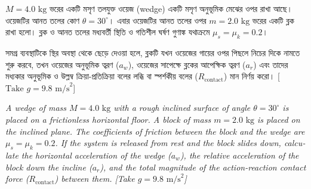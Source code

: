 \documentclass[12pt, a4paper]{article}
\begin{document}
\begin{tcolorbox}[questionbox={প্রশ্ন (Question)17}]
\noindent
$M = 4.0\text{ kg}$ ভরের একটি মসৃণ তলযুক্ত ওয়েজ (wedge) একটি মসৃণ অনুভূমিক মেঝের ওপর রাখা আছে। ওয়েজটির আনত তলের কোণ $\theta = 30^\circ$। এবার ওয়েজটির আনত তলের ওপর $m = 2.0\text{ kg}$ ভরের একটি ব্লক রাখা হলো। ব্লক ও আনত তলের মধ্যবর্তী স্থিতি ও গতিশীল ঘর্ষণ গুণাঙ্ক যথাক্রমে $\mu_s = \mu_k = 0.2$। 

\vspace{0.3em}
\noindent
সমগ্র ব্যবস্থাটিকে স্থির অবস্থা থেকে ছেড়ে দেওয়া হলে, ব্লকটি যখন ওয়েজের গায়ের ওপর পিছলে নিচের দিকে নামতে শুরু করবে, তখন ওয়েজের অনুভূমিক ত্বরণ ($a_w$), ওয়েজের সাপেক্ষে ব্লকের আপেক্ষিক ত্বরণ ($a_r$) এবং তাদের মধ্যকার অনুভূমিক ও উল্লম্ব ক্রিয়া-প্রতিক্রিয়া বলের লব্ধি বা স্পর্শকীয় বলের ($R_{\text{contact}}$) মান নির্ণয় করো। [$\text{Take } g = 9.8\text{ m/s}^2$]

\vspace{0.8em}
\begin{english}
\noindent\textit{\color{darkgray}
A wedge of mass $M = 4.0\text{ kg}$ with a rough inclined surface of angle $\theta = 30^\circ$ is placed on a frictionless horizontal floor. A block of mass $m = 2.0\text{ kg}$ is placed on the inclined plane. The coefficients of friction between the block and the wedge are $\mu_s = \mu_k = 0.2$. If the system is released from rest and the block slides down, calculate the horizontal acceleration of the wedge ($a_w$), the relative acceleration of the block down the incline ($a_r$), and the total magnitude of the action-reaction contact force ($R_{\text{contact}}$) between them. [Take $g = 9.8\text{ m/s}^2$]
}
\end{english}
\end{tcolorbox}
\end{document}
